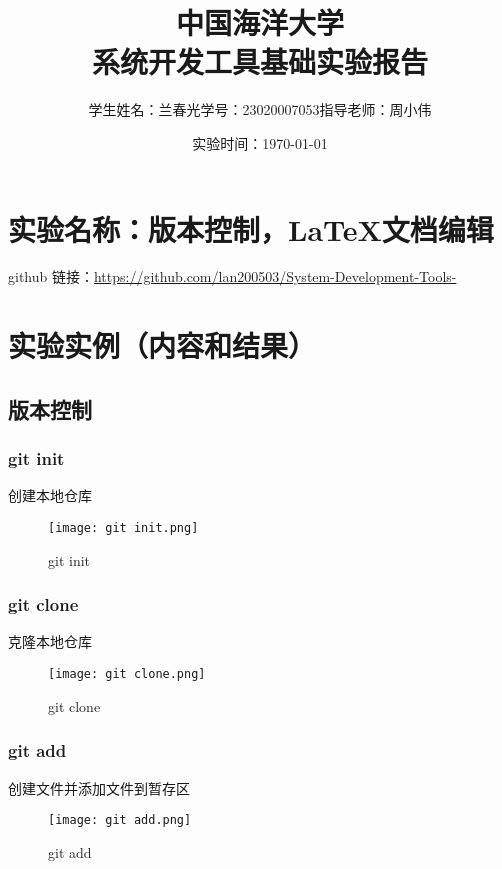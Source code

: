 \documentclass{ctexart}
\begin{document}
\title{中国海洋大学\\系统开发工具基础实验报告}
\author{学生姓名：兰春光\hspace{20}学号：23020007053\hspace{20}指导老师：周小伟}
\date{\hspace{5}实验时间：\today}
\maketitle
\footnotesize\tableofcontents




\section{实验名称：版本控制，\LaTeX 文档编辑}

github 链接：\href{URL}{https://github.com/lan200503/System-Development-Tools-}

\section{实验实例（内容和结果）}

\subsection{版本控制}

\subsubsection{git init}
创建本地仓库\\
\begin{figure}[h]
    
    \centering
    \texttt{[image: git init.png]}
    \caption{git init}
    \label{fig:enter-label}
\end{figure}

\subsubsection{git clone}
克隆本地仓库\\
\begin{figure}[h]
    \centering
    \texttt{[image: git clone.png]}
    \caption{git clone}
    \label{fig:enter-label}
\end{figure}

\subsubsection{git add}
创建文件并添加文件到暂存区\\
\begin{figure}[H] 
    
    \centering
    \texttt{[image: git add.png]}
    \caption{git add}
    \label{fig:enter-label}
\end{figure}
\end{document}
